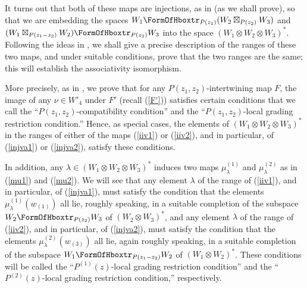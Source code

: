 \documentclass[12pt]{article}
\begin{document}
It turns out that both of these maps are injections, as in
\cite{tensor4} (as we shall prove), so that we are embedding the
spaces $W_1\hboxtr_{P(z_1)}(W_2 \boxtimes_{P(z_2)} W_3)$ and $(W_1
\boxtimes_{P(z_1-z_2)} W_2)\hboxtr_{P(z_2)} W_3$ into the space
$(W_1\otimes W_2 \otimes W_3)^*$. Following the ideas in
\cite{tensor4}, we shall give a precise description of the ranges of
these two maps, and under suitable conditions, prove that the two
ranges are the same; this will establish the associativity
isomorphism.

More precisely, as in \cite{tensor4}, we prove that for any $P(z_1,
z_2)$-intertwining map $F$, the image of any $\nu\in W'_4$ under $F'$
(recall (\ref{F'})) satisfies certain conditions that we call the
``$P(z_1, z_2)$-compatibility condition'' and the ``$P(z_1,
z_2)$-local grading restriction condition.''  Hence, as special cases,
the elements of $(W_1\otimes W_2 \otimes W_3)^*$ in the ranges of
either of the maps (\ref{iiv1}) or (\ref{iiv2}), and in particular, of
(\ref{injva1}) or (\ref{injva2}), satisfy these conditions.

In addition, any $\lambda\in (W_1\otimes W_2\otimes W_3)^*$ induces
two maps $\mu^{(1)}_\lambda$ and $\mu^{(2)}_\lambda$ as in (\ref{mu1})
and (\ref{mu2}).  We will see that any element $\lambda$ of the range
of (\ref{iiv1}), and in particular, of (\ref{injva1}), must satisfy
the condition that the elements $\mu^{(1)}_\lambda(w_{(1)})$ all lie,
roughly speaking, in a suitable completion of the subspace
$W_2\hboxtr_{P(z_2)} W_3$ of $(W_2\otimes W_3)^*$, and any element
$\lambda$ of the range of (\ref{iiv2}), and in particular, of
(\ref{injva2}), must satisfy the condition that the elements
$\mu^{(2)}_\lambda(w_{(3)})$ all lie, again roughly speaking, in a
suitable completion of the subspace $W_1\hboxtr_{P(z_1-z_2)} W_2$ of
$(W_1\otimes W_2)^*$.  These conditions will be called the
``$P^{(1)}(z)$-local grading restriction condition'' and the
``$P^{(2)}(z)$-local grading restriction condition,'' respectively.
\end{document}
